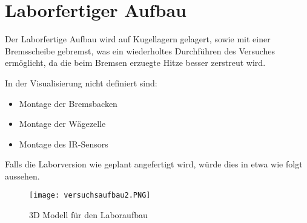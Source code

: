 \section{Laborfertiger Aufbau}

Der Laborfertige Aufbau wird auf Kugellagern gelagert, sowie mit einer Bremsscheibe gebremst, was ein wiederholtes Durchführen des Versuches ermöglicht, da die beim Bremsen erzuegte Hitze besser zerstreut wird.

In der Visualisierung nicht definiert sind:

\begin{itemize}
    \item Montage der Bremsbacken
    \item Montage der Wägezelle
    \item Montage des IR-Sensors
\end{itemize}

Falls die Laborversion wie geplant angefertigt wird, würde dies in etwa wie folgt aussehen.

\begin{figure}[H]
    \begin{center}
        \texttt{[image: versuchsaufbau2.PNG]}
        \caption{3D Modell für den Laboraufbau}
    \end{center}
\end{figure}